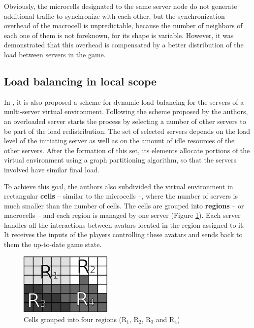 Obviously, the microcells designated to the same server node do not generate additional traffic to synchronize with each other, but the synchronization overhead of the macrocell is unpredictable, because the number of neighbors of each one of them is not foreknown, for its shape is variable. However, it was demonstrated \cite{devleeschauwer2005dma} that this overhead is compensated by a better distribution of the load between servers in the game. %


\subsection{Load balancing in local scope}
\label{sec:local}
	
In \cite{lee2003sdl}, it is also proposed a scheme for dynamic load balancing for the servers of a multi-server virtual environment. Following the scheme proposed by the authors, an overloaded server starts the process by selecting a number of other servers to be part of the load redistribution. The set of selected servers depends on the load level of the initiating server as well as on the amount of idle resources of the other servers. After the formation of this set, its elements allocate portions of the virtual environment using a graph partitioning algorithm, so that the servers involved have similar final load.

To achieve this goal, the authors also subdivided the virtual environment in rectangular \textbf{cells} -- similar to the microcells --, where the number of servers is much smaller than the number of cells. The cells are grouped into \textbf{regions} -- or macrocells -- and each region is managed by one server (Figure \ref{fig:macromicro}). Each server handles all the interactions between avatars located in the region assigned to it. It receives the inputs of the players controlling these avatars and sends back to them the up-to-date game state. 

\begin{figure}
 \centering
 \includegraphics[width=0.4\textwidth]{images/macromicro}
 \caption{Cells grouped into four regions (R$_1$, R$_2$, R$_3$ and R$_4$)}
 \label{fig:macromicro}
\end{figure}

